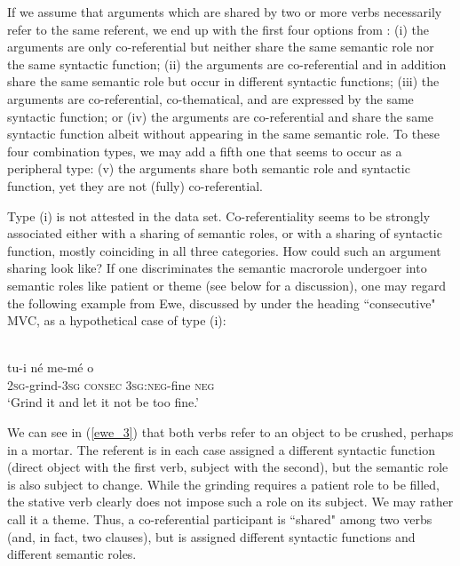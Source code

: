 If we assume that arguments which are shared by two or more verbs necessarily refer to the same referent, we end up with the first four options from : (i) the arguments are only co-referential but neither share the same semantic role nor the same syntactic function; (ii) the arguments are co-referential and in addition share the same semantic role but occur in different syntactic functions; (iii) the arguments are co-referential, co-thematical, and are expressed by the same syntactic function; or (iv) the arguments are co-referential and share the same syntactic function albeit without appearing in the same semantic role. To these four combination types, we may add a fifth one that seems to occur as a peripheral type: (v) the arguments share both semantic role and syntactic function, yet they are not (fully) co-referential.

Type (i) is not attested in the data set. Co-referentiality seems to be strongly associated either with a sharing of semantic roles, or with a sharing of syntactic function, mostly coinciding in all three categories. How could such an argument sharing look like? If one discriminates the semantic macrorole undergoer into semantic roles like patient or theme (see below for a discussion), one may regard the following example from Ewe, discussed by \citet{ameka2005multiverb} under the heading ``consecutive" MVC, as a hypothetical case of type (i):

\ea \label{ewe_3}
\\
\gll tu-i né me-mé o \\
2\textsc{sg}-grind-3\textsc{sg} \textsc{consec} 3\textsc{sg}:\textsc{neg}-fine \textsc{neg} \\
\glft `Grind it and let it not be too fine.'\\ 
\z

We can see in (\ref{ewe_3}) that both verbs refer to an object to be crushed, perhaps in a mortar. The referent is in each case assigned a different syntactic function (direct object with the first verb, subject with the second), but the semantic role is also subject to change. While the grinding requires a patient role to be filled, the stative verb clearly does not impose such a role on its subject. We may rather call it a theme. Thus, a co-referential participant is ``shared" among two verbs (and, in fact, two clauses), but is assigned different syntactic functions and different semantic roles.

